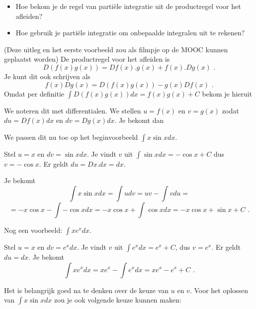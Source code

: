 \documentclass{article}
\begin{document}
\begin{itemize}
\item Hoe bekom je de regel van parti\"ele integratie uit de productregel voor het afleiden?
\item Hoe gebruik je parti\"ele integratie om onbepaalde integralen uit te rekenen?
\end{itemize}

\noindent (Deze uitleg en het eerste voorbeeld zou als filmpje op de MOOC kunnen geplaatst worden)
De productregel voor het afleiden is
\[
D(f(x)g(x))=Df(x).g(x)+f(x).Dg(x) \text { .}
\]
Je kunt dit ook schrijven als
\[
f(x)Dg(x)=D(f(x)g(x))-g(x)Df(x) \text { .}
\]
Omdat per definitie $\int D(f(x)g(x))dx = f(x)g(x)+C$ bekom je hieruit \vspace{5mm}

\fbox{
\begin{minipage}{8 cm}
\[
\int f(x)Dg(x)dx=f(x)g(x)-\int g(x)Df(x)dx
\]
\end{minipage}}\vspace{0,5 cm}

We noteren dit met differentialen.
We stellen $u=f(x)$ en $v=g(x)$ zodat $du=Df(x)dx$ en $dv=Dg(x)dx$.
Je bekomt dan \vspace{5mm}

\fbox{
\begin{minipage}{5 cm}
\[
\int udv=uv-\int vdu
\]
\end{minipage}}\vspace{0,5 cm}

We passen dit nu toe op het beginvoorbeeld $\int x \sin x dx$.

Stel $u=x$ en $dv=\sin x dx$.
Je vindt $v$ uit $\int \sin x dx=-\cos x + C$ dus $v=-\cos x$.
Er geldt $du = Dx .dx=dx$.

Je bekomt
\[
\int x \sin x dx = \int udv=uv-\int vdu=
\]
\[
=-x \cos x- \int -\cos x dx = -x \cos x + \int \cos x dx=- x \cos x + \sin x +C \text { .}
\]
\vspace{2mm}

\noindent Nog een voorbeeld: $\int x e^x dx$.

Stel $u=x$ en $dv=e^xdx$.
Je vindt $v$ uit $\int e^xdx=e^x+C$, dus $v=e^x$.
Er geldt $du=dx$.
Je bekomt
\[
\int xe^xdx=xe^x-\int e^xdx=xe^x-e^x+C \text { .}
\]
\vspace{2mm}

Het is belangrijk goed na te denken over de keuze van $u$ en $v$. Voor het oplossen van $\int x \sin x dx$ zou je ook volgende keuze kunnen maken:
\end{document}
